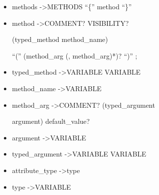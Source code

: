 \begin{itemize}
 \item methods   -\textgreater   METHODS  ``\{''  method  ``\}''

 \item method   -\textgreater   COMMENT?  VISIBILITY?  
 
 (typed{\_}method \textbar method{\_}name)  
 
 ``(''  (method{\_}arg  (,  method{\_}arg)*)?  ``)''  ;

 \item typed{\_}method   -\textgreater   VARIABLE  VARIABLE

 \item method{\_}name   -\textgreater   VARIABLE

 \item method{\_}arg   -\textgreater   COMMENT?  (typed{\_}argument 
 
 \textbar argument)  default{\_}value?

 \item argument   -\textgreater   VARIABLE

 \item typed{\_}argument   -\textgreater   VARIABLE  VARIABLE

 \item attribute{\_}type   -\textgreater   type

 \item type   -\textgreater   VARIABLE

 \end{itemize}